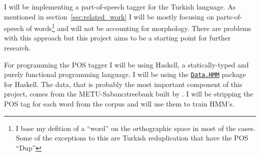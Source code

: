 \documentclass{article}
\newcommand{\hmmURL}{https://hackage.haskell.org/package/hmm-0.2.1.1/docs/Data-HMM.html}
\begin{document}
I will be implementing a part-of-speech tagger for the Turkish language. As
mentioned in section~\ref{sec:related_work} I will be mostly focusing on parts-of-speech
of words\footnote{I base my defition of a ``word'' on the orthographic space in
  most of the cases. Some of the exceptions to this are Turkish reduplication
  that have the POS ``Dup''} and will not be accounting for morphology. There are problems with this
approach but this project aims to be a starting point for further research.

For programming the POS tagger I will be using Haskell, a statically-typed and purely
functional programming language. I will be using the
\href{\hmmURL}{\texttt{Data.HMM}} package for
Haskell. The data, that is probably the most important component of this
project, comes from the METU-Sabanc\i treebank built by
\citet{oflazer2003building}. I will be stripping the POS tag for each word from
the corpus and will use them to train HMM's.



\end{document}
